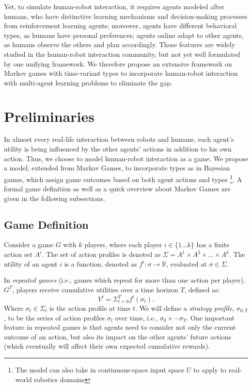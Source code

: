 \documentclass[letterpaper, 10 pt, conference]{ieeeconf}  %
\begin{document}
Yet, to simulate human-robot interaction, it requires agents modeled after 
humans, who have distinctive learning mechanisms and decision-making processes 
from reinforcement learning agents; moreover, agents have different behavioral 
types, as humans have personal preferences; agents online adapt to other 
agents, as humans observe the others and plan accordingly. Those features are 
widely studied in the human-robot interaction community, but not yet well 
formulated by one unifying framework. We therefore propose 
an extensive framework on Markov games with time-variant types to incorporate 
human-robot interaction with multi-agent learning problems to eliminate the gap. 



\section{Preliminaries}
In almost every real-life interaction between robots and humans, each agent's utility is being influenced by the other agents' actions in addition to his own action. Thus, we choose to model human-robot interaction as a game. We propose a model, extended from Markov Games, to incorporate types as in Bayesian games, which assign game outcomes based on both agent actions and types \footnote{The model can also take in continuous-space input space $U$ to apply to real-world robotics domains}. A formal game definition as well as a quick overview about Markov Games are given in the following subsections.  
\subsection{Game Definition}
Consider a game $G$ with $k$ players, where each player $i \in \{1...k\}$ has 
a finite action set $A^i$. The set of action profiles is denoted as 
$\Sigma = A^1 \times A^2 \times ... \times A^k$. The utility of an 
agent $i$ is a function, denoted as $f^i: \sigma \rightarrow \mathbb{R} $, 
evaluated at $\sigma \in \Sigma$. 

In \textit{repeated games} (i.e., games which repeat for more than one action per player), $G^T$, players receive cumulative utilities over a 
time horizon $T$, defined as:
\begin{equation}
	V^i=\Sigma_{t=0}^{T} f^i(\sigma_t).
\end{equation}
Where $\sigma_t \in \Sigma_t$ is the action profile at time $t$.
We will define a \textit{strategy profile}, $\sigma_{0:T}$, to be the series of action profiles $\sigma_t$ over time, i.e., $\sigma_0 \times \cdots \sigma_T$. One important feature in repeated games is that agents need to consider not only the current outcome of an action, but also its impact on the other agents' future actions (which eventually will affect their own expected cumulative rewards).
\end{document}
